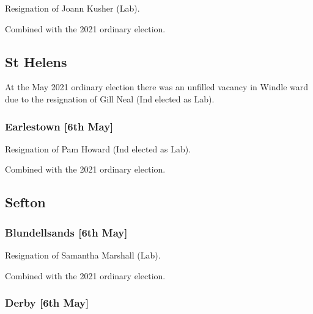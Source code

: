 \documentclass[a4paper,openany]{book}
\begin{document}
\begin{resultsiii}

Resignation of Joann Kusher (Lab).

Combined with the 2021 ordinary election.

\subsection*{St Helens}

At the May 2021 ordinary election there was an unfilled vacancy in Windle ward due to the resignation of Gill Neal (Ind elected as Lab).

\subsubsection*{Earlestown \hspace*{\fill}\nolinebreak[1]%
	\enspace\hspace*{\fill}
	[6th May]}


Resignation of Pam Howard (Ind elected as Lab).

Combined with the 2021 ordinary election.

\subsection*{Sefton}

\subsubsection*{Blundellsands \hspace*{\fill}\nolinebreak[1]%
	\enspace\hspace*{\fill}
	[6th May]}


Resignation of Samantha Marshall (Lab).

Combined with the 2021 ordinary election.

\subsubsection*{Derby \hspace*{\fill}\nolinebreak[1]%
	\enspace\hspace*{\fill}
	[6th May]}


\end{resultsiii}
\end{document}
